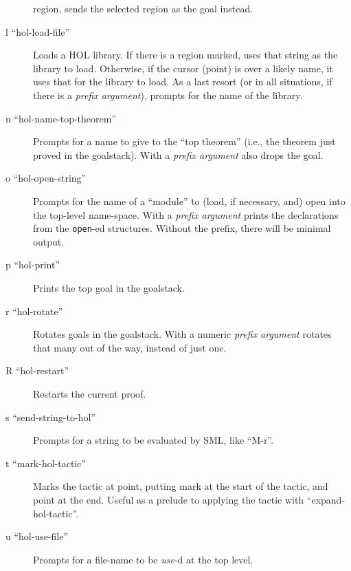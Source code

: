 \documentclass[10pt]{article}
\begin{document}
\begin{description}
  region, sends the selected region as the goal instead.
\item [l ``hol-load-file''] Loads a HOL library.  If there is a region
  marked, uses that string as the library to load.  Otherwise, if the
  cursor (point) is over a likely name, it uses that for the library
  to load.  As a last resort (or in all situations, if there is a
  \emph{prefix argument}), prompts for the name of the library.
\item [n ``hol-name-top-theorem''] Prompts for a name to give to the
  ``top theorem'' (i.e., the theorem just proved in the goalstack).
  With a \emph{prefix argument} also drops the goal.
\item [o ``hol-open-string''] Prompts for the name of a ``module'' to (load, if necessary, and) open into the top-level name-space.
  With a \emph{prefix argument} prints the declarations from the \texttt{open}-ed structures.  Without the prefix, there will be minimal output.
\item [p ``hol-print''] Prints the top goal in the goalstack.
\item [r ``hol-rotate''] Rotates goals in the goalstack.  With a
  numeric \emph{prefix argument} rotates that many out of the way,
  instead of just one.
\item [R ``hol-restart''] Restarts the current proof.
\item [s ``send-string-to-hol''] Prompts for a string to be evaluated
  by SML, like ``M-r''.
\item [t ``mark-hol-tactic''] Marks the tactic at point, putting mark
  at the start of the tactic, and point at the end.  Useful as a
  prelude to applying the tactic with ``expand-hol-tactic''.
\item [u ``hol-use-file''] Prompts for a file-name to be \emph{use}-d
  at the top level.

\end{description}
\end{document}
